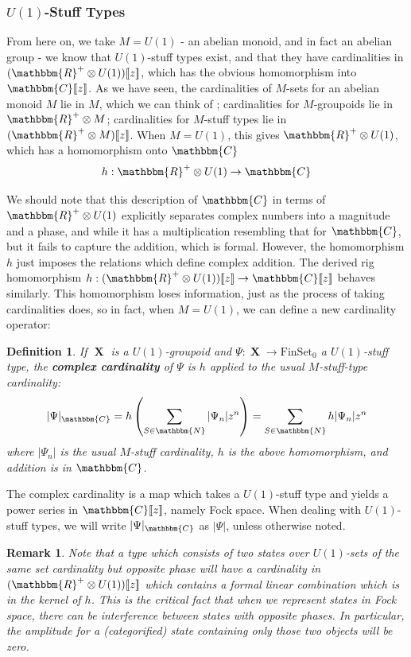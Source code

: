 \documentclass{amsart} \usepackage{amsmath,amssymb,bbm}
\newcommand{\opname}[1]{\operatorname{#1}}
\newtheorem{definition}{Definition}
\newcommand{\catname}[1]{\boldsymbol{\opname{{#1}}}}
\newcommand{\FSN}{\catname{FinSet_0}}
\newcommand{\UR}{\mathbbm{R}^+ \otimes U(1)}
\newcommand{\MRp}{\mathbbm{R}^+ \otimes M}
\newcommand{\MRz}{(\mathbbm{R}^+ \otimes M)[\![z]\!]}
\newcommand{\URz}{(\mathbbm{R}^+ \otimes U(1))[\![z]\!]}
\newcommand{\Cz}{\mathbbm{C}[\![z]\!]}
\newtheorem{varremark}{Remark}
\newenvironment{remark}{\begin{varremark}\em}{\em\end{varremark}}
\begin{document}
\subsubsection{$U(1)$-Stuff Types}

From here on, we take $M=U(1)$ - an abelian monoid, and in fact an
abelian group - we know that $U(1)$-stuff types exist, and that they
have cardinalities in $\URz$, which has the obvious homomorphism into
$\Cz$.  As we have seen, the cardinalities of $M$-sets for an abelian
monoid $M$ lie in $M$, which we can think of ; cardinalities for
$M$-groupoids lie in $\MRp$; cardinalities for $M$-stuff types lie in
$\MRz$. When $M=U(1)$, this gives $\UR$, which has a homomorphism onto
$\mathbbm{C}$ 
\begin{equation}
  h : \UR \rightarrow \mathbbm{C}
\end{equation}

We should note that this description of $\mathbbm{C}$ in terms of
$\UR$ explicitly separates complex numbers into a magnitude and a
phase, and while it has a multiplication resembling that for
$\mathbbm{C}$, but it fails to capture the addition, which is formal.
However, the homomorphism $h$ just imposes the relations which define
complex addition.  The derived rig homomorphism $h: \URz \rightarrow
\Cz$ behaves similarly.  This homomorphism loses information, just as
the process of taking cardinalities does, so in fact, when $M=U(1)$,
we can define a new cardinality operator:

\begin{definition} If $\catname{X}$ is a $U(1)$-groupoid and
$\Psi:\catname{X} \rightarrow \FSN$ a $U(1)$-stuff type, the
\textbf{complex cardinality} of $\Psi$ is $h$ applied to the usual
$M$-stuff-type cardinality:
\begin{equation}
    |\Psi|_{\mathbbm{C}} = h \left( \sum_{S \in \mathbbm{N}} |\Psi_n| z^n \right) = \sum_{S \in \mathbbm{N}} h|\Psi_n| z^n
\end{equation} where $|\Psi_n|$ is the usual $M$-stuff cardinality,
$h$ is the above homomorphism, and addition is in $\mathbbm{C}$.
\end{definition}

The complex cardinality is a map which takes a $U(1)$-stuff type and
yields a power series in $\Cz$, namely Fock space.  When dealing with
$U(1)$-stuff types, we will write $|\Psi|_{\mathbbm{C}}$ as
$|\Psi|$, unless otherwise noted.

\begin{remark}Note that a type which consists of two states over
$U(1)$-sets of the same set cardinality but opposite phase will have a
cardinality in $\URz$ which contains a formal linear combination which
is in the \textit{kernel} of $h$.  This is the critical fact that when
we represent states in Fock space, there can be \textit{interference}
between states with opposite phases.  In particular, the amplitude for
a (categorified) state containing only those two objects will be zero.
\end{remark}
\end{document}
